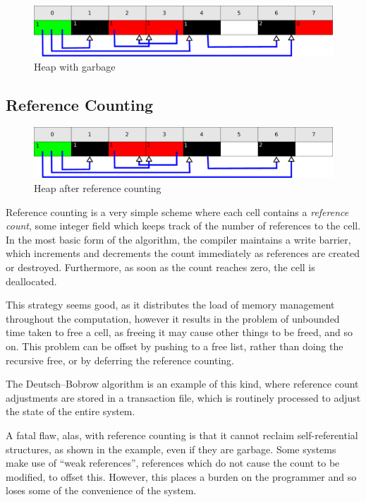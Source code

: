 \begin{figure}[h]
  \centering
  \includegraphics[width=\textwidth]{lit-gc-before}
  \caption{Heap with garbage}
  \label{fig:lit-gc-before}
\end{figure}

\subsection{Reference Counting}
\label{sec:lit-gc-refcount}

\begin{figure}[h]
  \centering
  \includegraphics[width=\textwidth]{lit-gc-refcount}
  \caption{Heap after reference counting}
  \label{fig:lit-gc-refcount}
\end{figure}

Reference counting is a very simple scheme where each \gls{cell}
contains a \textit{reference count}, some integer field which keeps
track of the number of references to the \gls{cell}. In the most basic
form of the algorithm, the compiler maintains a write barrier, which
increments and decrements the count immediately as references are
created or destroyed. Furthermore, as soon as the count reaches zero,
the \gls{cell} is deallocated\cite{Collins60}.

This strategy seems good, as it distributes the load of memory
management throughout the computation, however it results in the
problem of unbounded time taken to free a \gls{cell}, as freeing it
may cause other things to be freed, and so on\cite{GarbageCollection}.
This problem can be offset by pushing to a \gls{free list}, rather
than doing the recursive free, or by deferring the reference counting.

The Deutsch--Bobrow algorithm is an example of this kind, where
reference count adjustments are stored in a transaction file, which is
routinely processed to adjust the state of the entire
system\cite{Deutsch76}.

A fatal flaw, alas, with reference counting is that it cannot reclaim
self-referential structures, as shown in the example, even if they are
garbage\cite{McBeth63}. Some systems make use of ``\glspl{weak
  reference}'', references which do not cause the count to be
modified, to offset this. However, this places a burden on the
programmer and so loses some of the convenience of the system.

